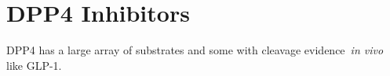 \section{DPP4 Inhibitors}
DPP4 has a large array of substrates and some with cleavage evidence~\textit{in vivo} like GLP-1. 